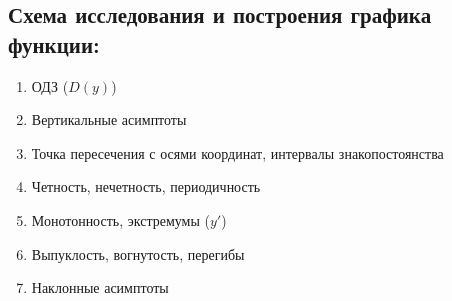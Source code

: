\documentclass[12pt]{article}
\begin{document}
    \subsection*{Схема исследования и построения графика функции:}
    \begin{enumerate}
        \item ОДЗ ($D(y)$)
        \item Вертикальные асимптоты
        \item Точка пересечения с осями координат, интервалы знакопостоянства
        \item Четность, нечетность, периодичность
        \item Монотонность, экстремумы ($y'$)
        \item Выпуклость, вогнутость, перегибы
        \item Наклонные асимптоты
    \end{enumerate}
\end{document}
